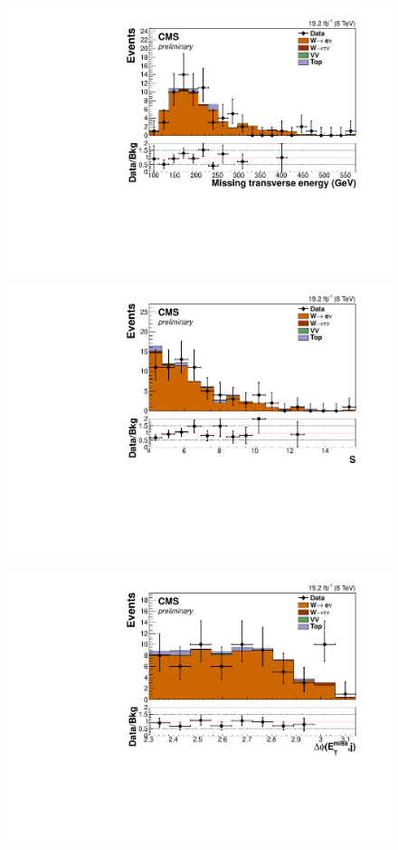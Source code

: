 \begin{figure}
  \includegraphics[width=.65\largefigwidth]{plots/parked/HIG-14-038-figs/output_sigreg/enu_metnomuons.pdf}
  \includegraphics[width=.65\largefigwidth]{plots/parked/HIG-14-038-figs/output_sigreg/enu_metnomu_significance.pdf}
  
  \includegraphics[width=.65\largefigwidth]{plots/parked/HIG-14-038-figs/output_sigreg/enu_alljetsmetnomu_mindphi.pdf}


\end{figure}
